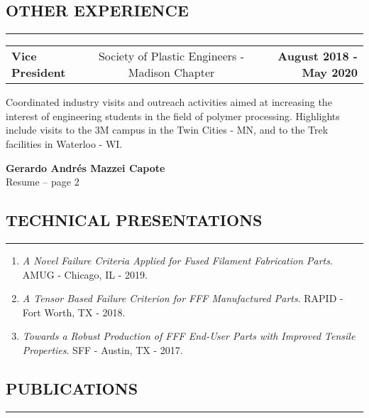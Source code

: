 \documentclass[11pt,letterpaper]{article}
\makeatletter
\newcommand{\headerrow}[3]
{\vspace{0.4em}
\noindent
\begin{tabular*}{\textwidth}{l @{\extracolsep{\fill}} cr}
	\textbf{#1} & %
	#2 &		  %
	\textbf{#3}\\ %
\end{tabular*}}
\makeatother
\begin{document}
\subsection*{OTHER EXPERIENCE}

\vspace{-0.5em}
\hrule
	
	\headerrow
		{Vice President}
		{Society of Plastic Engineers - Madison Chapter} 
		{August 2018 - May 2020}
		Coordinated industry visits and outreach activities aimed at increasing the interest of engineering students in the field of polymer processing. Highlights include visits to the 3M campus in the Twin Cities - MN, and to the Trek facilities in Waterloo - WI. 
	
\pagebreak %
\thispagestyle{empty} %

\begin{center}
	\LARGE \textbf{Gerardo Andrés Mazzei Capote} \\
	\normalsize Resume -- page 2
\end{center}

\subsection*{TECHNICAL PRESENTATIONS}
\vspace{-0.5em}
\hrule
\vspace{0.6em}

\begin{enumerate}
	\item \emph{A Novel Failure Criteria Applied for Fused Filament Fabrication Parts}. AMUG - Chicago, IL - 2019. 
	\item \emph{A Tensor Based Failure Criterion for FFF Manufactured Parts}.  RAPID - Fort Worth, TX - 2018.
	\item \emph{Towards a Robust Production of FFF End-User Parts with Improved Tensile Properties}. SFF - Austin, TX - 2017. 

\end{enumerate}


\subsection*{PUBLICATIONS}
	\vspace{-0.5em}
	\hrule
	\vspace{0.6em}
\end{document}
